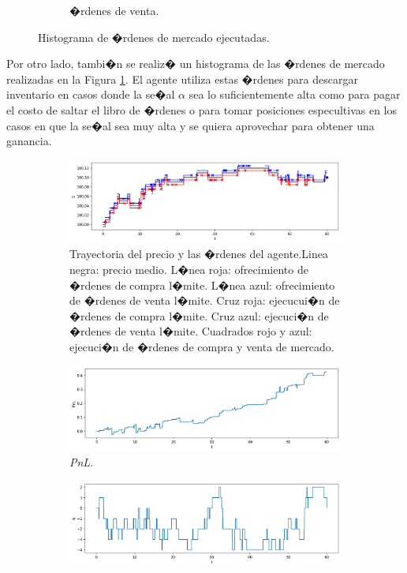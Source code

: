 \documentclass[12pt,a4paper,spanish]{article}%
\begin{document}
\begin{figure}[H]
\begin{subfigure}{0.45\textwidth}
	\caption{�rdenes de venta.}
\end{subfigure}
	\caption{Histograma de �rdenes de mercado ejecutadas.}
	\label{fig:marketordersplusexecutions}
\end{figure}

Por otro lado, tambi�n se realiz� un histograma de las �rdenes de mercado realizadas en la Figura \ref{fig:marketordersplusexecutions}. El agente utiliza estas �rdenes para descargar inventario en casos donde la se�al $\alpha$ sea lo suficientemente alta como para pagar el costo de saltar el libro de �rdenes o para tomar posiciones especultivas en los casos en que la se�al sea muy alta y se quiera aprovechar para obtener una ganancia.

\begin{figure}[H]
\begin{subfigure}{0.8\textwidth}
	\centering
	\includegraphics[width=1\linewidth]{figuras/orders_final}
	\caption{Trayectoria del precio y las �rdenes del agente.Linea negra: precio medio. L�nea roja: ofrecimiento de �rdenes de compra l�mite. L�nea azul: ofrecimiento de �rdenes de venta l�mite.  Cruz roja: ejecucui�n de �rdenes de compra l�mite. Cruz azul: ejecuci�n de �rdenes de venta l�mite. Cuadrados rojo y azul: ejecuci�n de �rdenes de compra y venta de mercado.}
	\label{fig:orders}
\end{subfigure}
\begin{subfigure}{0.8\textwidth}
	\centering
	\includegraphics[width=1\linewidth]{figuras/pnl_final}
	\caption{\textit{PnL}.}
	\label{fig:pnl}
\end{subfigure}
\begin{subfigure}{0.8\textwidth}
	\centering
	\includegraphics[width=1\linewidth]{figuras/q_final}

\end{subfigure}
\end{figure}
\end{document}
